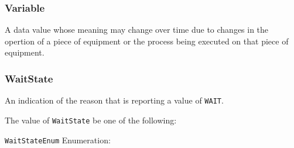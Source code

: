 \subsubsection{Variable}
\label{sec:Variable}



A data value whose meaning may change over time due to changes in the opertion of a piece of equipment or the process being executed on that piece of equipment.



\subsubsection{WaitState}
\label{sec:WaitState}



An indication of the reason that  is reporting a value of \texttt{WAIT}.


The value of \texttt{WaitState} \MUST be one of the following: 


\texttt{WaitStateEnum} Enumeration:

